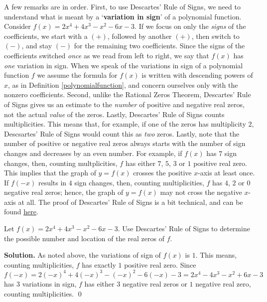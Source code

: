 A few remarks are in order. First, to use Descartes' Rule of Signs, we need to understand what is meant by a `\textbf{variation in sign}' of a polynomial function.  Consider $f(x) = 2x^4+4x^3-x^2-6x-3$.  If we focus on only the \textit{signs} of the coefficients, we start with a $(+)$, followed by another $(+)$, then switch to $(-)$, and stay $(-)$ for the remaining two coefficients.  Since the signs of the coefficients switched \textit{once} as we read from left to right, we say that $f(x)$ has \textit{one} variation in sign.  When we speak of the variations in sign of a polynomial function $f$ we assume the formula for $f(x)$ is written with descending powers of $x$, as in Definition \ref{polynomialfunction}, and concern ourselves only with the nonzero coefficients.  Second, unlike the Rational Zeros Theorem, Descartes' Rule of Signs gives us an estimate to the \textit{number} of positive and negative real zeros, not the actual \textit{value} of the zeros. Lastly, Descartes' Rule of Signs counts multiplicities.  This means that, for example, if one of the zeros has multiplicity $2$, Descsartes' Rule of Signs would count this as \textit{two} zeros.  Lastly, note that the number of positive or negative real zeros always starts with the number of sign changes and decreases by an even number.  For example, if $f(x)$ has $7$ sign changes, then, counting multplicities, $f$ has either $7$, $5$, $3$ or $1$ positive real zero.  This implies that the graph of $y=f(x)$ crosses the positive $x$-axis at least once.  If $f(-x)$ results in $4$ sign changes, then, counting multiplicities, $f$ has $4$, $2$ or $0$ negative real zeros;  hence, the graph of $y=f(x)$ may not cross the negative $x$-axis at all.  The proof of Descartes' Rule of Signs is a bit technical, and can be found \href{http://www.cut-the-knot.org/fta/ROS2.shtml}{\underline{here}}. 

\begin{ex}  Let $f(x) = 2x^4+4x^3-x^2-6x-3$.  Use Descartes' Rule of Signs to determine the possible number and location of the real zeros of $f$.

{\bf Solution.}  As noted above, the variations of sign of $f(x)$ is $1$. This means, counting multiplicities, $f$ has exactly $1$ positive real zero.  Since $f(-x)=2(-x)^4+4(-x)^3-(-x)^2-6(-x)-3=2x^4-4x^3-x^2+6x-3$ has $3$ variations in sign, $f$ has either $3$ negative real zeros or $1$ negative real zero, counting multiplicities. \qed

\label{DRSex}

\end{ex}

